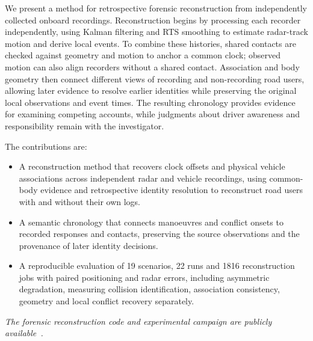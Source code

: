 We present a method for retrospective forensic reconstruction from
independently collected onboard recordings. Reconstruction begins by
processing each recorder independently, using Kalman filtering and RTS smoothing
to estimate radar-track motion and derive local events. To combine these
histories, shared contacts are checked against geometry and motion to
anchor a common clock; observed motion can also align recorders without
a shared contact. Association and body geometry then connect different
views of recording and non-recording road users, allowing later evidence
to resolve earlier identities while preserving the original local
observations and event times. The resulting chronology provides
evidence for examining competing accounts, while judgments about driver
awareness and responsibility remain with the investigator.

The contributions are:
\begin{itemize}
  \item A reconstruction method that recovers clock offsets and physical
  vehicle associations across independent radar and vehicle recordings,
  using common-body evidence and retrospective identity resolution to
  reconstruct road users with and without their own logs.
  \item A semantic chronology that connects manoeuvres and conflict
  onsets to recorded responses and contacts, preserving the source
  observations and the provenance of later identity decisions.
  \item A reproducible evaluation of 19 scenarios, 22 runs and
  1816 reconstruction jobs with paired positioning and radar errors,
  including asymmetric degradation, measuring collision identification,
  association consistency, geometry and local conflict recovery separately.
\end{itemize}

\emph{The forensic reconstruction code and experimental campaign are publicly available~\cite{causaldrive2026code}.}
